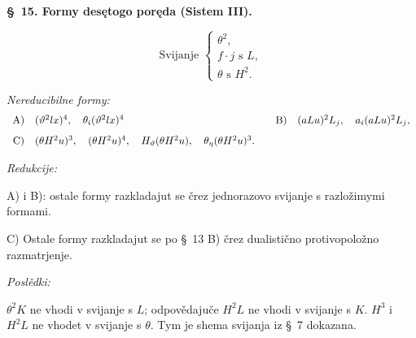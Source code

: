 \documentclass[11pt]{article}
\begin{document}
\begin{center}
\textbf{\S\ 15. \quad Formy desętogo poręda (Sistem III).}
\end{center}
\[
\text{Svijanje }\left\{\begin{array}{l}
\theta^2,\\
f\cdot j \text{ s }L,\\
\theta \text{ s }H^2.
\end{array}\right.
\]

\noindent\textit{Nereducibilne formy:}
\[
\begin{array}{c@{\quad}l@{\qquad}c@{\quad}l}
\mathrm{A)}&(\vartheta^2lx)^4,\quad
\theta_i(\vartheta^2lx)^4&
\mathrm{B)}&(aLu)^2L_j,\quad a_i(aLu)^2L_j,\\[0.8em]
\mathrm{C)}&(\theta H^2u)^3,\quad
(\theta H^2u)^4,\quad
H_\vartheta(\theta H^2u),\quad
\theta_\eta(\theta H^2u)^3.
\end{array}
\]

\noindent\textit{Redukcije:}

\noindent\mbox{A)} i \mbox{B)}: ostale formy razkladajut se črez jednorazovo svijanje s razložimymi formami.

\noindent\mbox{C)} Ostale formy razkladajut se po \S\ 13 \mbox{B)} črez dualistično protivopoložno razmatrjenje.

\noindent\textit{Poslědki:}

$\theta^2K$ ne vhodi v svijanje s $L$; odpovědajuče $H^2L$ ne vhodi v svijanje s $K$. $H^3$ i $H^2L$ ne vhodet v svijanje s $\theta$. Tym je shema svijanja iz \S\ 7 dokazana.
\end{document}
